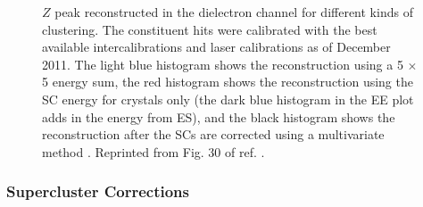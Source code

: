 \documentclass[dissertation.tex]{subfiles}
\begin{document}
\begin{figure}
	\caption{$Z$ peak reconstructed in the dielectron channel for different kinds of clustering.  The constituent hits were calibrated with the best available intercalibrations and laser calibrations as of December 2011.  The light blue histogram shows the reconstruction using a 5 $\times$ 5 energy sum, the red histogram shows the reconstruction using the SC energy for crystals only (the dark blue histogram in the EE plot adds in the energy from ES), and the black histogram shows the reconstruction after the SCs are corrected using a multivariate method \cite{Higgs_AN}.  Reprinted from Fig. 30 of ref. \cite{Higgs_AN}.}
	\label{fig:Z_mass_vs_corrections}
\end{figure}

\subsubsection{Supercluster Corrections}
\label{sec:Supercluster Corrections}
\end{document}
